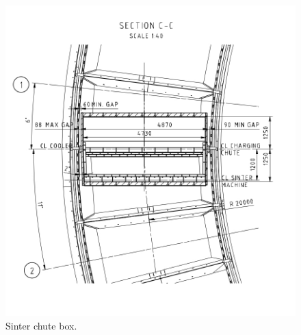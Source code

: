 \begin{figure}[!htb]
\centering
\includegraphics[width=.60\columnwidth]{056sinterChuteBox}
\caption[Sinter chute box]{Sinter chute box.}
\label{fig:056sinterChuteBox}
\end{figure}